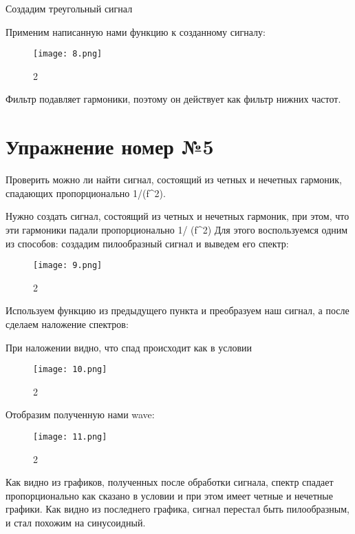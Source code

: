 \documentclass[10pt,a4paper,oneside]{article}
\begin{document}
Создадим треугольный сигнал

Применим написанную нами функцию к созданному сигналу: 

\begin{figure}[H]
        \centering
        \texttt{[image: 8.png]}
        \caption{2}
        \label{fig:first}
\end{figure}

Фильтр подавляет гармоники, поэтому он действует как фильтр нижних частот.
\section{Упражнение номер №5}
Проверить можно ли найти сигнал, состоящий из четных и нечетных гармоник, спадающих пропорционально 1/(f^2).

Нужно создать сигнал, состоящий из четных и нечетных гармоник, при этом, что эти гармоники падали пропорционально 1/ (f^2) Для этого воспользуемся одним из способов: создадим пилообразный сигнал и выведем его спектр:  

\begin{figure}[H]
        \centering
        \texttt{[image: 9.png]}
        \caption{2}
        \label{fig:first}
\end{figure}

Используем функцию из предыдущего пункта и преобразуем наш сигнал, а после сделаем наложение спектров: 

При наложении видно, что спад происходит как в условии

\begin{figure}[H]
        \centering
        \texttt{[image: 10.png]}
        \caption{2}
        \label{fig:first}
\end{figure}

Отобразим полученную нами wave:

\begin{figure}[H]
        \centering
        \texttt{[image: 11.png]}
        \caption{2}
        \label{fig:first}
\end{figure}

Как видно из графиков, полученных после обработки сигнала, спектр спадает пропорционально как сказано в условии и при этом имеет четные и нечетные графики. Как видно из последнего графика, сигнал перестал быть пилообразным, и стал похожим на синусоидный.
\end{document}

